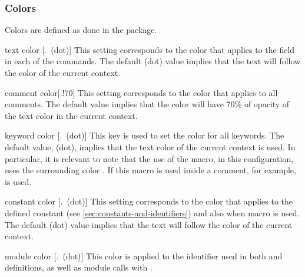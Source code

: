 \documentclass[a4paper, 11pt]{article}
\begin{document}
\subsubsection{Colors}
Colors are defined as done in the  package.

\begin{option}{text color}{}
    [.\mbox{\normalfont\normalcolor\normalsize~(dot)}]
    This setting corresponds to the color that applies to the  field in each of the commands. The default  (dot) value implies that the text will follow the color of the current context.
\end{option}

\begin{option}{comment color}{}[.!70]
    This setting corresponds to the color that applies to all comments. The default value implies that the color will have 70\% of opacity of the text color in the current context.
\end{option}

\begin{option}{keyword color}{}
    [.\mbox{\normalfont\normalcolor\normalsize~(dot)}]
    This key is used to set the color for all keywords. The default value,  (dot), implies that the text color of the current context is used. In particular, it is relevant to note that the use of the  macro, in this configuration, uses the surrounding color . If this macro is used inside a comment, for example,  is used.
\end{option}

\begin{option}{constant color}{}
    [.\mbox{\normalfont\normalcolor\normalsize~(dot)}]
    This setting corresponds to the color that applies to the defined constant (see \cref{sec:constants-and-identifiers}) and also when macro  is used. The default  (dot) value implies that the text will follow the color of the current context.
\end{option}

\begin{option}{module color}{}
    [.\mbox{\normalfont\normalcolor\normalsize~(dot)}]
    This color is applied to the identifier used in both  and  definitions, as well as module calls with .
\end{option}
\end{document}
